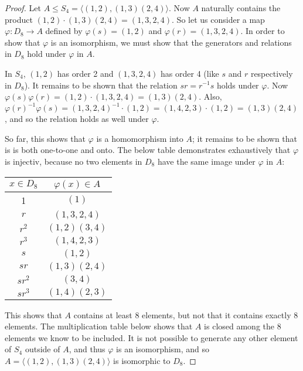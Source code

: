 \documentclass{article}
\begin{document}
\begin{proof}
    Let $A \leq S_4 = \langle (1, 2), (1, 3)(2, 4) \rangle$. Now $A$ naturally contains the product $(1, 2) \cdot (1, 3)(2, 4) = (1, 3, 2, 4)$. So let us consider a map $\varphi: D_8 \rightarrow A$ defined by $\varphi(s) = (1, 2)$ and $\varphi(r) = (1, 3, 2, 4)$. In order to show that $\varphi$ is an isomorphism, we must show that the generators and relations in $D_8$ hold under $\varphi$ in $A$.

    In $S_4$, $(1, 2)$ has order 2 and $(1, 3, 2, 4)$ has order 4 (like $s$ and $r$ respectively in $D_8$). It remains to be shown that the relation $sr = r^{-1}s$ holds under $\varphi$. Now $\varphi(s)\varphi(r) = (1, 2) \cdot (1, 3, 2, 4) = (1, 3)(2, 4)$. Also, $\varphi(r)^{-1}\varphi(s) = (1, 3, 2, 4)^{-1} \cdot (1, 2) = (1, 4, 2, 3) \cdot (1, 2) = (1, 3)(2, 4)$, and so the relation holds as well under $\varphi$.

    So far, this shows that $\varphi$ is a homomorphism into $A$; it remains to be shown that is is both one-to-one and onto. The below table demonstrates exhaustively that $\varphi$ is injectiv, because no two elements in $D_8$ have the same image under $\varphi$ in $A$:

    \begin{center}
        \begin{tabu}{ |c|c| } 
            \hline
            $x \in D_8$ & $\varphi(x) \in A$ \\
             & $(1)$ \\
            \hline
            $r$ & $(1, 3, 2, 4)$ \\
            \hline
            $r^2$ & $(1, 2)(3, 4)$ \\
            \hline
            $r^3$ & $(1, 4, 2, 3)$ \\
            \hline
            $s$ & $(1, 2)$ \\
            \hline
            $sr$ & $(1, 3)(2, 4)$ \\
            \hline
            $sr^2$ & $(3, 4)$ \\
            \hline
            $sr^3$ & $(1, 4)(2, 3)$ \\
            \hline
        \end{tabu}
    \end{center}

    This shows that $A$ contains at least 8 elements, but not that it contains exactly 8 elements. The multiplication table below shows that $A$ is closed among the 8 elements we know to be included. It is not possible to generate any other element of $S_4$ outside of $A$, and thus $\varphi$ is an isomorphism, and so $A = \langle (1, 2), (1, 3)(2, 4) \rangle$ is isomorphic to $D_8$.


\end{proof}
\end{document}
